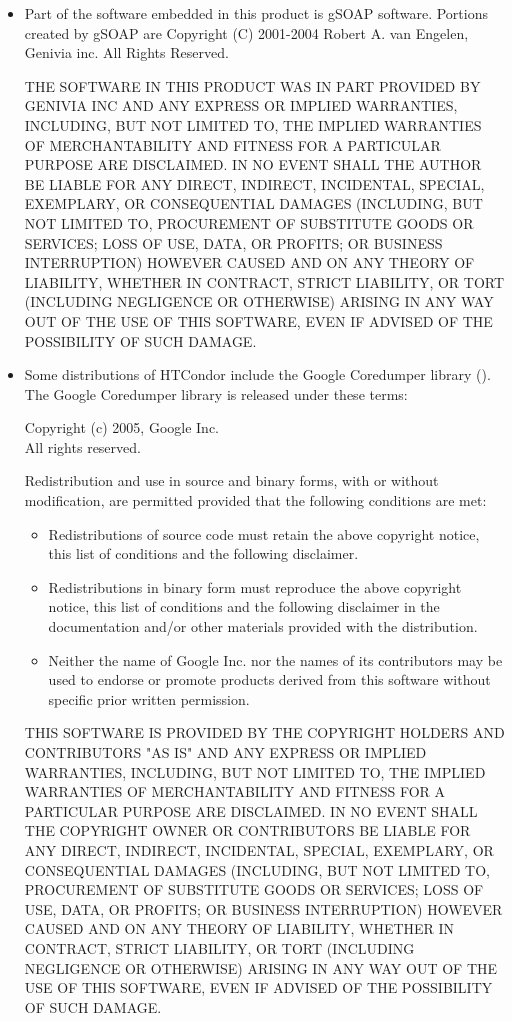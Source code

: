 \begin{itemize}
\item
Part of the software embedded in this product is gSOAP software.
Portions created by gSOAP are Copyright (C) 2001-2004 Robert A. van Engelen, Genivia inc. All Rights Reserved.

THE SOFTWARE IN THIS PRODUCT WAS IN PART PROVIDED BY GENIVIA INC AND ANY EXPRESS OR IMPLIED WARRANTIES, INCLUDING, BUT NOT LIMITED TO, THE IMPLIED WARRANTIES OF MERCHANTABILITY AND FITNESS FOR A PARTICULAR PURPOSE ARE DISCLAIMED. IN NO EVENT SHALL THE AUTHOR BE LIABLE FOR ANY DIRECT, INDIRECT, INCIDENTAL, SPECIAL, EXEMPLARY, OR CONSEQUENTIAL DAMAGES (INCLUDING, BUT NOT LIMITED TO, PROCUREMENT OF SUBSTITUTE GOODS OR SERVICES; LOSS OF USE, DATA, OR PROFITS; OR BUSINESS INTERRUPTION) HOWEVER CAUSED AND ON ANY THEORY OF LIABILITY, WHETHER IN CONTRACT, STRICT LIABILITY, OR TORT (INCLUDING NEGLIGENCE OR OTHERWISE) ARISING IN ANY WAY OUT OF THE USE OF THIS SOFTWARE, EVEN IF ADVISED OF THE POSSIBILITY OF SUCH DAMAGE.

\item
Some distributions of HTCondor include the Google Coredumper library
().  The Google Coredumper
library is released under these terms:

Copyright (c) 2005, Google Inc. \\
All rights reserved.

Redistribution and use in source and binary forms, with or without
modification, are permitted provided that the following conditions are
met:

	\begin{itemize}
    \item Redistributions of source code must retain the above copyright
notice, this list of conditions and the following disclaimer.

    \item Redistributions in binary form must reproduce the above
copyright notice, this list of conditions and the following disclaimer
in the documentation and/or other materials provided with the
distribution.

    \item Neither the name of Google Inc. nor the names of its
contributors may be used to endorse or promote products derived from
this software without specific prior written permission.
	\end{itemize}

THIS SOFTWARE IS PROVIDED BY THE COPYRIGHT HOLDERS AND CONTRIBUTORS
"AS IS" AND ANY EXPRESS OR IMPLIED WARRANTIES, INCLUDING, BUT NOT
LIMITED TO, THE IMPLIED WARRANTIES OF MERCHANTABILITY AND FITNESS FOR
A PARTICULAR PURPOSE ARE DISCLAIMED. IN NO EVENT SHALL THE COPYRIGHT
OWNER OR CONTRIBUTORS BE LIABLE FOR ANY DIRECT, INDIRECT, INCIDENTAL,
SPECIAL, EXEMPLARY, OR CONSEQUENTIAL DAMAGES (INCLUDING, BUT NOT
LIMITED TO, PROCUREMENT OF SUBSTITUTE GOODS OR SERVICES; LOSS OF USE,
DATA, OR PROFITS; OR BUSINESS INTERRUPTION) HOWEVER CAUSED AND ON ANY
THEORY OF LIABILITY, WHETHER IN CONTRACT, STRICT LIABILITY, OR TORT
(INCLUDING NEGLIGENCE OR OTHERWISE) ARISING IN ANY WAY OUT OF THE USE
OF THIS SOFTWARE, EVEN IF ADVISED OF THE POSSIBILITY OF SUCH DAMAGE.

\end{itemize}
